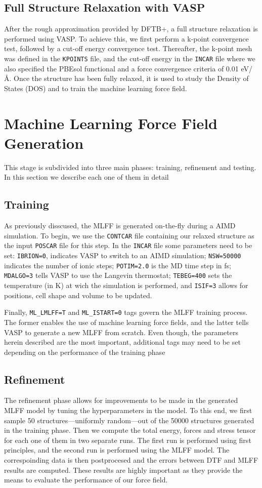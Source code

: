 \subsection{Full Structure Relaxation with VASP}
After the rough approximation provided by DFTB+, a full structure relaxation is performed using VASP. To achieve this, we first perform a k-point convergence test, followed by a cut-off energy convergence test. Thereafter, the k-point mesh was defined in the \texttt{KPOINTS} file, and the cut-off energy in the \texttt{INCAR} file where we also specified the PBEsol functional and a force convergence criteria of 0.01 eV/\AA. Once the structure has been fully relaxed, it is used to study the Density of States (DOS) and to train the machine learning force field.

\section{Machine Learning Force Field Generation}
This stage is subdivided into three main phases: training, refinement and testing. In this section we describe each one of them in detail 
\subsection{Training}
As previously disscused, the MLFF is generated on-the-fly during a AIMD simulation. To begin, we use the \texttt{CONTCAR} file containing our relaxed structure as the input \texttt{POSCAR} file for this step. In the \texttt{INCAR} file some parameters need to be set: \texttt{IBRION=0}, indicates VASP to switch to an AIMD simulation; \texttt{NSW=50000} indicates the number of ionic steps; \texttt{POTIM=2.0} is the MD time step in fs; \texttt{MDALGO=3} tells VASP to use the Langevin thermostat; \texttt{TEBEG=400} sets the temperature (in K) at wich the simulation is performed, and \texttt{ISIF=3} allows for positions, cell shape and volume to be updated. 

Finally, \texttt{ML\_LMLFF=T} and \texttt{ML\_ISTART=0} tags govern the MLFF training process. The former enables the use of machine learning force fields, and the latter tells VASP to generate a new MLFF from scratch. Even though, the parameters herein described are the most important, additional tags may need to be set depending on the performance of the training phase

\subsection{Refinement}
The refinement phase allows for improvements to be made in the generated MLFF model by tuning the hyperparameters in the model. To this end, we first sample 50 structures---uniformly random---out of the 50000 structures generated in the training phase. Then we compute the total energy, forces and stress tensor for each one of them in two separate runs. The first run is performed using first principles, and the second run is performed using the MLFF model. The correspoinding data is then postprocesed and the errors between DTF and MLFF results are computed. These results are highly important as they provide the means to evaluate the performance of our force field. 

